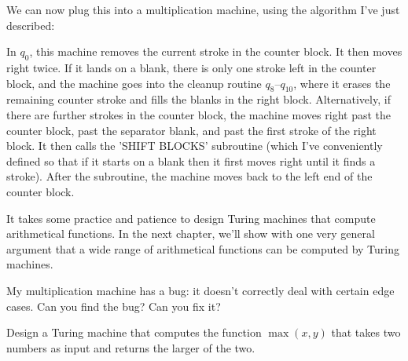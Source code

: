 \begin{center}
  
\end{center}

We can now plug this into a multiplication machine,
using the algorithm I've just described:

\begin{center}
  
\end{center}

In $q_{0}$,
this machine removes the current stroke in the counter block.
It then moves right twice.
If it lands on a blank,
there is only one stroke left in the counter block,
and the machine goes into the cleanup routine $q_{8}$--$q_{10}$,
where it erases the remaining counter stroke and
fills the blanks in the right block.
Alternatively,
if there are further strokes in the counter block,
the machine moves right past the counter block,
past the separator blank,
and past the first stroke of the right block.
It then calls the 'SHIFT BLOCKS' subroutine
(which I've conveniently defined so that
if it starts on a blank then it first moves right until it finds a stroke).
After the subroutine,
the machine moves back to the left end of the counter block.

It takes some practice and patience to design Turing machines that compute arithmetical functions.
In the next chapter, we'll show with one very general argument that
a wide range of arithmetical functions can be computed by Turing machines.

\begin{exercise}
  My multiplication machine has a bug:
  it doesn't correctly deal with certain edge cases.
  Can you find the bug?
  Can you fix it?
\end{exercise}


\begin{exercise}\label{ex:max}
  Design a Turing machine that computes the function $\max(x,y)$
  that takes two numbers as input and returns the larger of the two.
\end{exercise}

